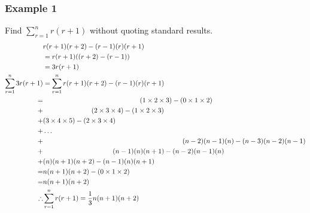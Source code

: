 \documentclass[class=article, crop=false]{standalone}
\begin{document}
\subsubsection*{Example 1}
Find $\sum^n_{r=1} r(r+1)$ without quoting standard results. 
\begin{align*}
& r(r+1)(r+2) - (r-1)(r)(r+1) \\
& = r(r+1)((r+2)-(r-1)) \\
& = 3r(r+1) \\
\sum^n_{r=1} 3r(r+1) & = \sum^n_{r=1} r(r+1)(r+2) - (r-1)(r)(r+1) \\
= & \hspace*{5cm} (1 \times 2 \times 3) - (0 \times 1 \times 2) \\
+ & \hspace*{2.5cm} (2 \times 3 \times 4) - (1 \times 2 \times 3) \\
+ & (3 \times 4 \times 5) - (2 \times 3 \times 4) \\
+ & \dots \\
+ & \hspace*{7.2cm} (n-2)(n-1)(n) - (n-3)(n-2)(n-1) \\
+ & \hspace*{3.6cm} (n-1)(n)(n+1) - (n-2)(n-1)(n) \\
+ & (n)(n+1)(n+2) - (n-1)(n)(n+1) \\
= & n(n+1)(n+2) - (0 \times 1 \times 2) \\
= & n(n+1)(n+2) \\
\therefore & \sum^n_{r=1} r(r+1) = \frac{1}{3}n(n+1)(n+2) \\
\end{align*}
\end{document}
